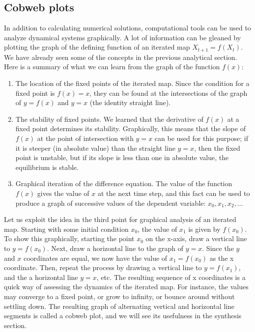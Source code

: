 \documentclass[11pt]{book}
\begin{document}
\subsection{Cobweb plots}
In addition to calculating numerical solutions, computational tools can be used to analyze dynamical systems graphically. A lot of information can be gleaned by plotting the graph of the defining function of an iterated map $X_{t+1} = f(X_t)$. We have already seen some of the concepts in the previous analytical section. Here is a summary of what we can learn from the graph of the function
$f(x)$:

\begin{enumerate}

\item The location of the fixed points of the iterated map. Since the condition for a fixed point is $f(x) = x$, they can be found at the intersections of the graph of $y=f(x)$ and $y=x$ (the identity straight line).

\item The stability of fixed points. We learned that the derivative of $f(x)$ at a fixed point determines its stability. Graphically, this means that the slope of $f(x)$ at the point of intersection with $y=x$ can be used for this purpose; if it is steeper (in absolute value) than the straight line $y=x$, then the fixed point is unstable, but if its slope is less than one in absolute value, the equilibrium is stable.

\item Graphical iteration of the difference equation. The value of the function $f(x)$ gives the value of $x$ at the next time step, and this fact can be used to produce a graph of successive values of the dependent variable: $x_0, x_1, x_2, ...$

\end{enumerate}

Let us exploit the idea in the third point for graphical analysis of an iterated map. Starting with some initial condition $x_0$, the value of $x_1$ is given by $f(x_0)$. To show this graphically, starting the point $x_0$ on the x-axis, draw a vertical line to $y=f(x_0)$. Next, draw a horizontal line to the graph of $y=x$. Since the $y$ and $x$ coordinates are equal, we now have the value of $x_1 = f(x_0)$ as the x coordinate. Then, repeat the process by drawing a vertical line to $y=f(x_1)$, and the a horizontal line $y=x$, etc. The resulting sequence of x coordinates is a quick way of assessing the dynamics of the iterated map.  For instance, the values may converge to a fixed point, or grow to infinity, or bounce around without settling down. The resulting graph of alternating vertical and horizontal line segments is called a cobweb plot, and we will see its usefulness in the synthesis section.
\end{document}
